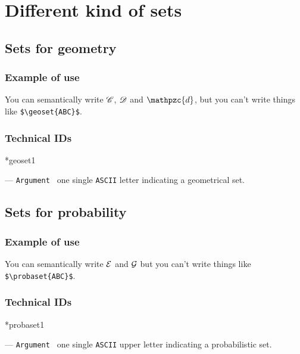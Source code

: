 \documentclass[12pt,a4paper]{article}
\makeatletter
\theoremstyle{definition}
\newcommand\IDmacro{\@ifstar{\@IDmacroStar}{\@IDmacroNoStar}}
\newcommand\@IDmacroNoStar[3]{%
        \texttt{%
        	\textbackslash#1%
        	\IfStrEq{#2}{0}{}{%
        		\,\,[#2 Option%
				\IfStrEq{#2}{1}{}{s}]%
			}%
    	    \,\,(#3 Argument%
				\IfStrEq{#3}{1}{}{s})%
	   	}
        \immediate\write\tempfile{macro@#1@#2@#3}%
    }
\newcommand\@IDmacroStar[2]{%
        \@IDmacroNoStar{#1}{0}{#2}%
    }
\newcommand\@IDoptarg[2]{%
    	\vspace{0.5em}
		--- \texttt{#1%
			\IfStrEq{#2}{}{:}{\,\##2:}%
		}%
	}
\newcommand\IDarg[1]{%
    	\@IDoptarg{Argument}{#1}%
	}
\newcommand\ascii{\texttt{ASCII}}
\newcommand\probaset[1]{
    	\IfSubStr{,A,B,C,D,E,F,G,H,I,J,K,L,M,N,O,P,Q,R,S,T,U,V,W,X,Y,Z,}{,#1,}{
        	\mathcal{#1}
    	}{%
        	\PackageError{lymath}{Command << probaset >> only accepts single upper case letters}%
    	}
	}
\newcommand\geoset[1]{
	    \IfSubStr{,A,B,C,D,E,F,G,H,I,J,K,L,M,N,O,P,Q,R,S,T,U,V,W,X,Y,Z,}{,#1,}{
        	\mathscr{#1}
    	}{%
	        \IfSubStr{,a,b,c,d,e,f,g,h,i,j,k,l,m,n,o,p,q,r,s,t,u,v,w,x,y,z,}{,#1,}{
        	    \mathpzc{#1}
    	    }{%
	            \PackageError{lymath}{Command << fieldset >> only accepts single h, k or upper case letter}%
        	}
    	}
	}
\makeatother
\begin{document}
\section{Different kind of sets}

    \subsection{Sets for geometry}

        \subsubsection{Example of use}

\begin{tcblisting}{}
You can semantically write $\geoset{C}$, $\geoset{D}$ and $\geoset{d}$, 
but you can't write things like \verb+$\geoset{ABC}$+.
\end{tcblisting}


        \subsubsection{Technical IDs}

\IDmacro*{geoset}{1}

\IDarg{} one single \ascii{} letter indicating a geometrical set.



    \subsection{Sets for probability}

        \subsubsection{Example of use}

\begin{tcblisting}{}
You can semantically write $\probaset{E}$ and $\probaset{G}$
but you can't write things like \verb+$\probaset{ABC}$+.
\end{tcblisting}


        \subsubsection{Technical IDs}

\IDmacro*{probaset}{1}

\IDarg{} one single \ascii{} upper letter indicating a probabilistic set.
\end{document}
